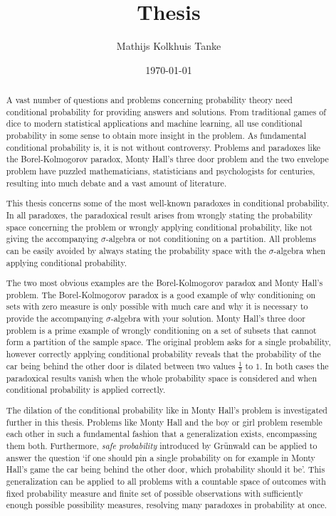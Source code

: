 \documentclass[a4paper]{report}
\title{Thesis}
\author{Mathijs Kolkhuis Tanke}
\date{\today}
\theoremstyle{plain}
\theoremstyle{definition}
\theoremstyle{remark}
\numberwithin{equation}{chapter}
\DeclareMathOperator{\1}{\mathbbm{1}}
\begin{document}
\begin{titlepage}

\end{titlepage}


\begin{abstract}
A vast number of questions and problems concerning probability theory need conditional probability for providing answers and solutions. From traditional games of dice to modern statistical applications and machine learning, all use conditional probability in some sense to obtain more insight in the problem. As fundamental conditional probability is, it is not without controversy. Problems and paradoxes like the Borel-Kolmogorov paradox, Monty Hall's three door problem and the two envelope problem have puzzled mathematicians, statisticians and psychologists for centuries, resulting into much debate and a vast amount of literature.

This thesis concerns some of the most well-known paradoxes in conditional probability. In all paradoxes, the paradoxical result arises from wrongly stating the probability space concerning the problem or wrongly applying conditional probability, like not giving the accompanying $\sigma$-algebra or not conditioning on a partition. All problems can be easily avoided by always stating the probability space with the $\sigma$-algebra when applying conditional probability.

The two most obvious examples are the Borel-Kolmogorov paradox and Monty Hall's problem. The Borel-Kolmogorov paradox is a good example of why conditioning on sets with zero measure is only possible with much care and why it is necessary to provide the accompanying $\sigma$-algebra with your solution. Monty Hall's three door problem is a prime example of wrongly conditioning on a set of subsets that cannot form a partition of the sample space. The original problem asks for a single probability, however correctly applying conditional probability reveals that the probability of the car being behind the other door is dilated between two values $\frac{1}{2}$ to $1$. In both cases the paradoxical results vanish when the whole probability space is considered and when conditional probability is applied correctly.

The dilation of the conditional probability like in Monty Hall's problem is investigated further in this thesis. Problems like Monty Hall and the boy or girl problem resemble each other in such a fundamental fashion that a generalization exists, encompassing them both. Furthermore, \emph{safe probability} introduced by Grünwald \cite{Grunwald18} can be applied to answer the question `if one should pin a single probability on for example in Monty Hall's game the car being behind the other door, which probability should it be'. This generalization can be applied to all problems with a countable space of outcomes with fixed probability measure and finite set of possible observations with sufficiently enough possible possibility measures, resolving many paradoxes in probability at once.
\end{abstract}
\end{document}
